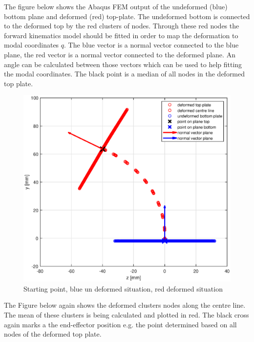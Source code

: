 The figure below shows the Abaqus FEM output of the undeformed (blue) bottom plane and deformed (red) top-plate. The undeformed bottom is connected to the deformed top by the red clusters of nodes. Through these red nodes the forward kinematics model should be fitted in order to map the deformation to modal coordinates $q$. The blue vector is a normal vector connected to the blue plane, the red vector is a normal vector connected to the deformed plane. An angle can be calculated between those vectors which can be used to help fitting the modal coordinates. The black point is a median of all nodes in the deformed top plate.

\begin{figure}[H]
    \centering
    \includegraphics[width = \linewidth]{Figures/Progress/main.eps}
    \caption{Starting point, blue un deformed situation, red deformed situation}
\end{figure}

The Figure below again shows the deformed clusters nodes along the centre line. The mean of these clusters is being calculated and plotted in red. The black cross again marks a the end-effector position e.g. the point determined based on all nodes of the deformed top plate.

